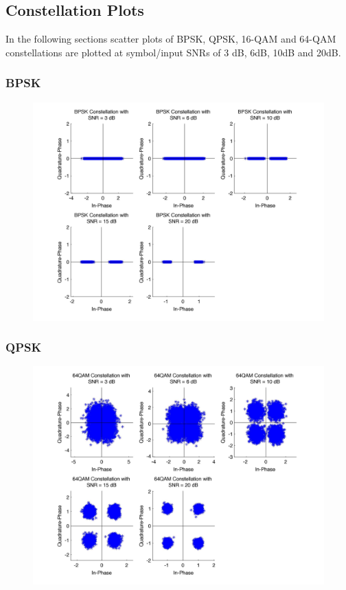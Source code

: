 \documentclass[]{article}
\begin{document}
\subsection{Constellation Plots}
In the following sections scatter plots of BPSK, QPSK, 16-QAM and 64-QAM constellations are plotted at symbol/input SNRs of 3 dB, 6dB, 10dB and 20dB.

\subsubsection{BPSK}
\begin{figure}[H]
\centering
\hspace*{-2cm}\includegraphics[width=1.3\textwidth]{bpConst.jpg}
\caption{}
\end{figure}
\subsubsection{QPSK}
\begin{figure}[H]
\centering
\hspace*{-2cm}\includegraphics[width=1.3\textwidth]{qpConst.jpg}
\caption{}
\end{figure}
\end{document}
